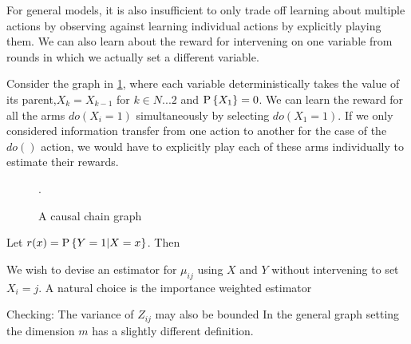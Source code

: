 For general models, it is also insufficient to only trade off learning about multiple actions by observing against learning individual actions by explicitly playing them. We can also learn about the reward for intervening on one variable from rounds in which we actually set a different variable.


Consider the graph in \cref{fig:causalchain}, where each variable deterministically takes the value of its parent,$X_k = X_{k-1}$ for $k\in {N...2}$ and $\P{X_1} = 0$. We can learn the reward for all the arms $do(X_i = 1)$ simultaneously by selecting $do(X_1 = 1)$. If we only considered information transfer from one action to another for the case of the $do()$ action, we would have to explicitly play each of these arms individually to estimate their rewards. 

\begin{figure}[h]
\centering
\caption{A causal chain graph}.
\label{fig:causalchain}
\end{figure} 


Let $r(x) = \P{Y = 1|X = x}$. Then



We wish to devise an estimator for $\mu_{ij}$ using $X$ and $Y$ without
intervening to set $X_i = j$. A natural choice is the importance weighted estimator


Checking:
The variance of $Z_{ij}$ may also be bounded
In the general graph setting the dimension $m$ has a slightly different definition.

